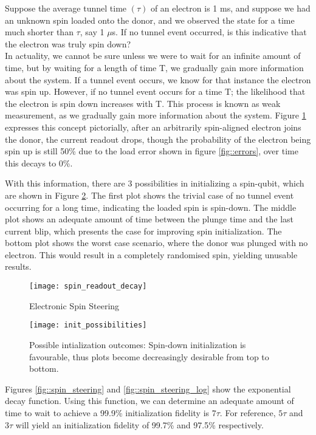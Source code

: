 Suppose the average tunnel time $(\tau)$ of an electron is 1 ms, and suppose we had an unknown spin loaded onto the donor, and we observed the state for a time much shorter than $\tau$, say 1 $\mu$s. If no tunnel event occurred, is this indicative that the electron was truly spin down? \\
In actuality, we cannot be sure unless we were to wait for an infinite amount of time, but by waiting for a length of time T, we gradually gain more information about the system. If a tunnel event occurs, we know for that instance the electron was spin up. However, if no tunnel event occurs for a time T; the likelihood that the electron is spin down increases with T. This process is known as weak measurement, as we gradually gain more information about the system. Figure \ref{fig::spin_readout_decay} expresses this concept pictorially, after an arbitrarily spin-aligned electron joins the donor, the current readout drops, though the probability of the electron being spin up is still 50\% due to the load error shown in figure \ref{fig::errors}, over time this decays to 0\%. 

With this information, there are 3 possibilities in initializing a spin-qubit, which are shown in Figure \ref{fig::init_possibilities}. The first plot shows the trivial case of no tunnel event occurring for a long time, indicating the loaded spin is spin-down. The middle plot shows an adequate amount of time between the plunge time and the last current blip, which presents the case for improving spin initialization. The bottom plot shows the worst case scenario, where the donor was plunged with no electron. This would result in a completely randomised spin, yielding unusable results. 

\begin{figure}[htbp!]
	\centering
	\texttt{[image: spin\_readout\_decay]}
	\caption{Electronic Spin Steering}
	\label{fig::spin_readout_decay}
\end{figure}

\begin{figure}[htbp!]
	\centering
	\texttt{[image: init\_possibilities]}
	\caption{Possible intialization outcomes: Spin-down initialization is favourable, thus plots become decreasingly desirable from top to bottom.}
	\label{fig::init_possibilities}
\end{figure}

Figures \ref{fig::spin_steering} and \ref{fig::spin_steering_log} show the exponential decay function. Using this function, we can determine an adequate amount of time to wait to achieve a 99.9\% initialization fidelity is $7 \tau$. For reference, $5 \tau$ and $3 \tau$ will yield an initialization fidelity of 99.7\% and 97.5\% respectively.

